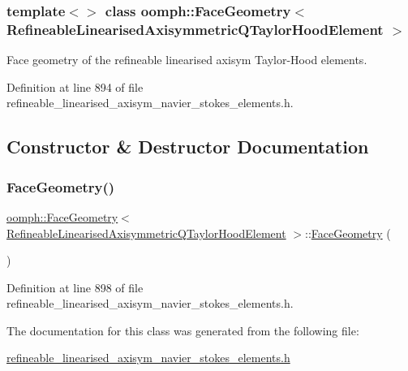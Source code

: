\subsubsection*{template$<$$>$\newline
class oomph\+::\+Face\+Geometry$<$ Refineable\+Linearised\+Axisymmetric\+Q\+Taylor\+Hood\+Element $>$}

Face geometry of the refineable linearised axisym Taylor-\/\+Hood elements. 

Definition at line 894 of file refineable\+\_\+linearised\+\_\+axisym\+\_\+navier\+\_\+stokes\+\_\+elements.\+h.



\subsection{Constructor \& Destructor Documentation}
\mbox{\label{classoomph_1_1FaceGeometry_3_01RefineableLinearisedAxisymmetricQTaylorHoodElement_01_4_a24729fdb057ba3aee33371c133b7ee83}} 
\subsubsection{\texorpdfstring{Face\+Geometry()}{FaceGeometry()}}
{\footnotesize\ttfamily \hyperlink{classoomph_1_1FaceGeometry}{oomph\+::\+Face\+Geometry}$<$ \hyperlink{classoomph_1_1RefineableLinearisedAxisymmetricQTaylorHoodElement}{Refineable\+Linearised\+Axisymmetric\+Q\+Taylor\+Hood\+Element} $>$\+::\hyperlink{classoomph_1_1FaceGeometry}{Face\+Geometry} (\begin{DoxyParamCaption}{ }\end{DoxyParamCaption})\hspace{0.3cm}{\ttfamily [inline]}}



Definition at line 898 of file refineable\+\_\+linearised\+\_\+axisym\+\_\+navier\+\_\+stokes\+\_\+elements.\+h.



The documentation for this class was generated from the following file\+:\begin{DoxyCompactItemize}
\item 
\hyperlink{refineable__linearised__axisym__navier__stokes__elements_8h}{refineable\+\_\+linearised\+\_\+axisym\+\_\+navier\+\_\+stokes\+\_\+elements.\+h}\end{DoxyCompactItemize}
